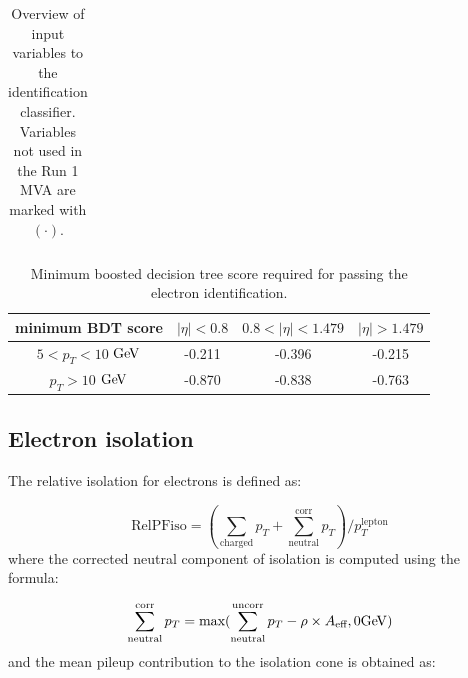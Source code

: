 \begin{table}[h!]
{\begin{tabular}{c|l}
\hline %
\hline %
     \end{tabular}}
    \caption{Overview of input variables to the identification classifier. Variables not used in the Run 1 MVA are marked with  $(\mathord{\cdot})$.}
    \label{tab:ele_ID_input_variables}
\end{table}


\begin{table}[h!]
\scriptsize
    \centering
    \begin{tabular}{c|c c c}
\hline %
minimum BDT score    &  $|\eta| < 0.8 $ & $0.8 < |\eta| < 1.479$ 	& $|\eta| > 1.479$      \\
\hline %
$ 5 < p_T < 10 $ $\mathrm{Ge\kern -0.1em V}$ &  -0.211      & -0.396  		& -0.215		\\
$p_T > 10$ $\mathrm{Ge\kern -0.1em V}$       &  -0.870		& -0.838		& -0.763		\\
\hline %
\hline %
     \end{tabular}
\small
    \caption{Minimum boosted decision tree score required for passing the electron identification.}
    \label{tab:ele_ID_WP}
\end{table}


\subsection{Electron isolation}
\label{sec:eleiso}

The relative isolation for electrons is defined as: 

\begin{equation}
\text{RelPFiso} = (\sum_{\text{charged}} p_T + \sum^{\text{corr}}_{\text{neutral}} p_T)/p_T^{\text{lepton}}  
\label{eqn:elepfrelisoeqn}
\end{equation} 
where the corrected neutral component of isolation is computed using the formula:

\begin{equation}
\label{eqn:neutralea}
  \sum^{\text{corr}}_{\text{neutral}} p_T = \text{max}(\sum^{\text{uncorr}}_{\text{neutral}} p_T - \rho \times A_\text{eff},0 \mathrm{Ge\kern -0.1em V})  
\end{equation}
and the mean pileup contribution to the isolation cone is obtained as:  


